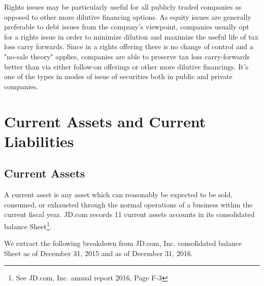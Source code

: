 Rights issues may be particularly useful for all publicly traded companies as opposed to other more dilutive financing options. As equity issues are generally preferable to debt issues from the company's viewpoint, companies usually opt for a rights issue in order to minimize dilution and maximize the useful life of tax loss carry forwards. Since in a rights offering there is no change of control and a "no-sale theory" applies, companies are able to preserve tax loss carry-forwards better than via either follow-on offerings or other more dilutive financings. It's one of the types in modes of issue of securities both in public and private companies.

\section{Current Assets and Current Liabilities}
\subsection{Current Assets}
A current asset is any asset which can reasonably be expected to be sold, consumed, or exhausted through the normal operations of a business within the current fiscal year. JD.com records 11 current assets accounts in its consolidated balance Sheet\footnote{See JD.com, Inc. annual report 2016, Page F-3}. 

We extract the following breakdown from JD.com, Inc. consolidated balance Sheet as of December 31, 2015 and as of December 31, 2016.\\

